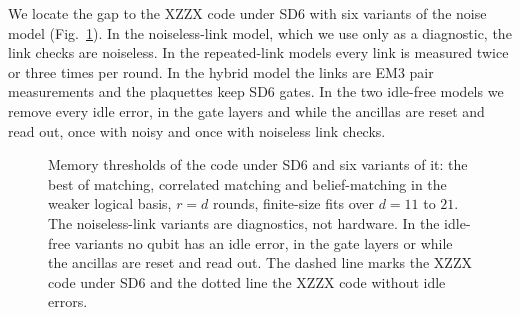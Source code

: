 
We locate the gap to the XZZX code under SD6 with six variants of the noise model (Fig.~\ref{fig:gap}). In the noiseless-link model, which we use only as a diagnostic, the link checks are noiseless. In the repeated-link models every link is measured twice or three times per round. In the hybrid model the links are EM3 pair measurements and the plaquettes keep SD6 gates. In the two idle-free models we remove every idle error, in the gate layers and while the ancillas are reset and read out, once with noisy and once with noiseless link checks.

\begin{figure}[t]
  \centering
  \caption{Memory thresholds of the \XYZ{} code under SD6 and six variants of it: the best of matching, correlated matching and belief-matching in the weaker logical basis, $r=d$ rounds, finite-size fits over $d=11$ to $21$. The noiseless-link variants are diagnostics, not hardware. In the idle-free variants no qubit has an idle error, in the gate layers or while the ancillas are reset and read out. The dashed line marks the XZZX code under SD6 and the dotted line the XZZX code without idle errors.}
  \label{fig:gap}
\end{figure}

